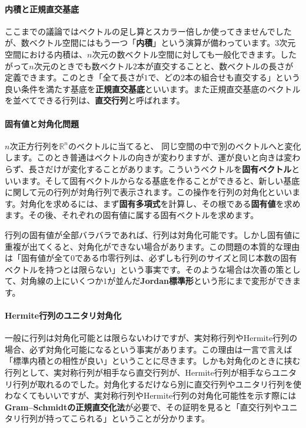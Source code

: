 \paragraph{内積と正規直交基底}

ここまでの議論ではベクトルの足し算とスカラー倍しか使ってきませんでしたが、数ベクトル空間にはもう一つ「\textbf{内積}」という演算が備わっています。$3$次元空間における内積は、$n$次元の数ベクトル空間に対しても一般化できます。したがって$n$次元のときでも数ベクトル$2$本が直交することと、数ベクトルの長さが定義できます。このとき「全て長さが$1$で、どの$2$本の組合せも直交する」という良い条件を満たす基底を\textbf{正規直交基底}といいます。また正規直交基底のベクトルを並べてできる行列は、\textbf{直交行列}と呼ばれます。

\paragraph{固有値と対角化問題}

$n$次正方行列を$\mathbb{R}^n$のベクトルに当てると、	同じ空間の中で別のベクトルへと変化します。このとき普通はベクトルの向きが変わりますが、運が良いと向きは変わらず、長さだけが変化することがあります。こういうベクトルを\textbf{固有ベクトル}といいます。そして固有ベクトルからなる基底を作ることができると、新しい基底に関して元の行列が対角行列で表示されます。この操作を行列の対角化といいます。対角化を求めるには、まず\textbf{固有多項式}を計算し、その根である\textbf{固有値}を求めます。その後、それぞれの固有値に属する固有ベクトルを求めます。

行列の固有値が全部バラバラであれば、行列は対角化可能です。しかし固有値に重複が出てくると、対角化ができない場合があります。この問題の本質的な理由は「固有値が全て$0$である巾零行列は、必ずしも行列のサイズと同じ本数の固有ベクトルを持つとは限らない」という事実です。そのような場合は次善の策として、対角線の上にいくつか$1$が並んだ\textbf{Jordan標準形}という形にまで変形ができます。

\paragraph{Hermite行列のユニタリ対角化}

一般に行列は対角化可能とは限らないわけですが、実対称行列やHermite行列の場合、必ず対角化可能になるという事実があります。この理由は一言で言えば「標準内積との相性が良い」ということに尽きます。しかも対角化のときに挟む行列として、実対称行列が相手なら直交行列が、Hermite行列が相手ならユニタリ行列が取れるのでした。対角化するだけなら別に直交行列やユニタリ行列を使わなくてもいいですが、実対称行列やHermite行列の対角化可能性を示す際には\textbf{Gram--Schmidtの正規直交化法}が必要で、その証明を見ると「直交行列やユニタリ行列が持ってこられる」ということが分かります。

